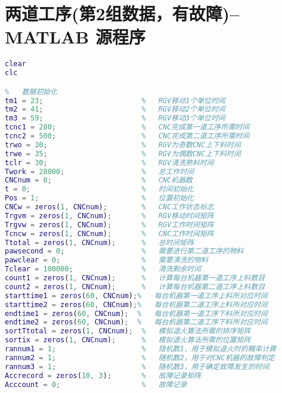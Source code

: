 \documentclass[no-math,withoutpreface,bwprint]{cumcmthesis} %
\numberwithin{equation}{section}
\numberwithin{figure}{section}
\numberwithin{table}{section}
\begin{document}
\section{ 两道工序(第2组数据，有故障)--MATLAB 源程序}
\begin{lstlisting}[language=matlab]
%   MATLAB初始化
clear
clc

%   数据初始化
tm1 = 23;                       %   RGV移动1个单位时间
tm2 = 41;                       %   RGV移动2个单位时间
tm3 = 59;                       %   RGV移动3个单位时间
tcnc1 = 280;                    %   CNC完成第一道工序所需时间
tcnc2 = 500;                    %   CNC完成第二道工序所需时间
trwo = 30;                      %   RGV为奇数CNC上下料时间
trwe = 35;                      %   RGV为偶数CNC上下料时间
tclr = 30;                      %   RGV清洗熟料时间
Twork = 28800;                  %   总工作时间
CNCnum = 8;                     %   CNC机器数
t = 0;                          %   时间初始化
Pos = 1;                        %   位置初始化
CNCw = zeros(1, CNCnum);        %   CNC工作状态标志
Trgvm = zeros(1, CNCnum);      	%   RGV移动时间矩阵
Trgvw = zeros(1, CNCnum);       %   RGV工作时间矩阵
Tcncw = zeros(1, CNCnum);       %   CNC工作时间矩阵
Ttotal = zeros(1, CNCnum);      %   总时间矩阵
pawsecond = 0;                  %   需要进行第二道工序的物料
pawclear = 0;                   %   需要清洗的物料
Tclear = 100000;                %   清洗剩余时间
count1 = zeros(1, CNCnum);      %   计算每台机器第一道工序上料数目
count2 = zeros(1, CNCnum);      %   计算每台机器第二道工序上料数目
starttime1 = zeros(60, CNCnum);%   每台机器第一道工序上料所对应时间
starttime2 = zeros(60, CNCnum);%   每台机器第二道工序上料所对应时间
endtime1 = zeros(60, CNCnum);  %   每台机器第一道工序下料所对应时间
endtime2 = zeros(60, CNCnum);  %   每台机器第二道工序下料所对应时间
sortTtotal = zeros(1, CNCnum);  %   模拟退火算法所需的排序矩阵
sortix = zeros(1, CNCnum);      %   模拟退火算法所需的位置矩阵
rannum1 = 1;                    %   随机数1，用于模拟退火时的概率计算
rannum2 = 1;                    %   随机数2，用于对CNC机器的故障判定
rannum3 = 1;                    %   随机数3，用于确定故障发生的时间
Accrecord = zeros(10, 3);       %   故障记录矩阵
Acccount = 0;                   %   故障记录


\end{lstlisting}
\end{document}
